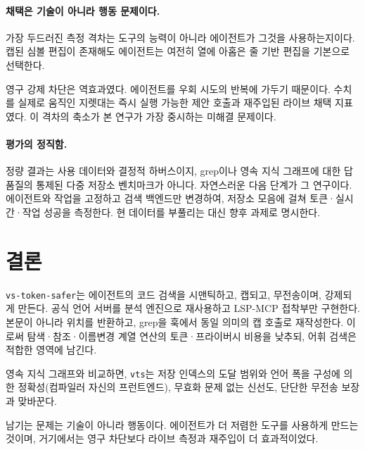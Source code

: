 \documentclass[11pt]{article}
\begin{document}
\paragraph{채택은 기술이 아니라 행동 문제이다.}
가장 두드러진 측정 격차는 도구의 능력이 아니라 에이전트가 그것을 사용하는지이다. 캡된 심볼
편집이 존재해도 에이전트는 여전히 열에 아홉은 줄 기반 편집을 기본으로 선택한다.

영구 강제 차단은 역효과였다. 에이전트를 우회 시도의 반복에 가두기 때문이다. 수치를 실제로
움직인 지렛대는 즉시 실행 가능한 제안 호출과 재주입된 라이브 채택 지표였다. 이 격차의 축소가
본 연구가 가장 중시하는 미해결 문제이다.

\paragraph{평가의 정직함.}
정량 결과는 사용 데이터와 결정적 하버스이지, grep이나 영속 지식 그래프에 대한 답 품질의 통제된
다중 저장소 벤치마크가 아니다. 자연스러운 다음 단계가 그 연구이다. 에이전트와 작업을 고정하고
검색 백엔드만 변경하여, 저장소 모음에 걸쳐 토큰·실시간·작업 성공을 측정한다. 현 데이터를
부풀리는 대신 향후 과제로 명시한다.

\section{결론}
\label{sec:conc}

\texttt{vs-token-safer}는 에이전트의 코드 검색을 시맨틱하고, 캡되고, 무전송이며, 강제되게
만든다. 공식 언어 서버를 분석 엔진으로 재사용하고 LSP-MCP 접착부만 구현한다. 본문이 아니라
위치를 반환하고, grep을 훅에서 동일 의미의 캡 호출로 재작성한다. 이로써 탐색·참조·이름변경
계열 연산의 토큰·프라이버시 비용을 낮추되, 어휘 검색은 적합한 영역에 남긴다.

영속 지식 그래프와 비교하면, \texttt{vts}는 저장 인덱스의 도달 범위와 언어 폭을 구성에 의한
정확성(컴파일러 자신의 프런트엔드), 무효화 문제 없는 신선도, 단단한 무전송 보장과 맞바꾼다.

남기는 문제는 기술이 아니라 행동이다. 에이전트가 더 저렴한 도구를 사용하게 만드는 것이며,
거기에서는 영구 차단보다 라이브 측정과 재주입이 더 효과적이었다.
\end{document}
